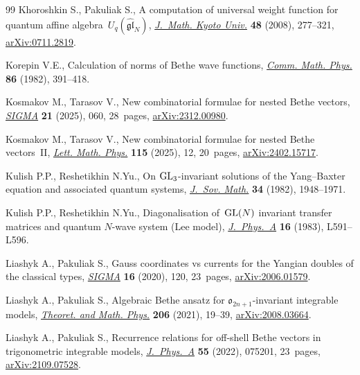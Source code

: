 \documentclass[pdftex]{sigma}
\theoremstyle{definition}
\begin{document}
\begin{thebibliography}{99}
Khoroshkin S., Pakuliak S., A computation of universal weight function for
 quantum affine algebra~{$U_q(\widehat{\mathfrak {gl}}_N)$},
 \href{https://doi.org/10.1215/kjm/1250271413}{\textit{J.~Math. Kyoto Univ.}}
 \textbf{48} (2008), 277--321,
 \href{http://arxiv.org/abs/0711.2819}{arXiv:0711.2819}.

Korepin V.E., Calculation of norms of {B}ethe wave functions,
 \href{https://doi.org/10.1007/BF01212176}{\textit{Comm. Math. Phys.}}
 \textbf{86} (1982), 391--418.

Kosmakov M., Tarasov V., New combinatorial formulae for nested {B}ethe vectors,
 \href{https://doi.org/10.3842/SIGMA.2025.060}{\textit{SIGMA}} \textbf{21}
 (2025), 060, 28~pages,
 \href{http://arxiv.org/abs/2312.00980}{arXiv:2312.00980}.

Kosmakov M., Tarasov V., New combinatorial formulae for nested {B}ethe
 vectors~{II}, \href{https://doi.org/10.1007/s11005-025-01896-2}{\textit{Lett.
 Math. Phys.}} \textbf{115} (2025), 12, 20~pages,
 \href{http://arxiv.org/abs/2402.15717}{arXiv:2402.15717}.

Kulish P.P., Reshetikhin N.Yu., On {${\rm GL}\sb{3}$}-invariant solutions of the
 {Y}ang--{B}axter equation and associated quantum systems,
 \href{https://doi.org/10.1007/BF01095104}{\textit{J.~Sov. Math.}} \textbf{34}
 (1982), 1948--1971.

Kulish P.P., Reshetikhin N.Yu., Diagonalisation of~{${\rm GL}(N)$} invariant
 transfer matrices and quantum {$N$}-wave system ({L}ee model),
 \href{https://doi.org/10.1088/0305-4470/16/16/001}{\textit{J.~Phys.~A}}
 \textbf{16} (1983), L591--L596.

Liashyk A., Pakuliak S., Gauss coordinates vs currents for the {Y}angian
 doubles of the classical types,
 \href{https://doi.org/10.3842/SIGMA.2020.120}{\textit{SIGMA}} \textbf{16}
 (2020), 120, 23~pages,
 \href{http://arxiv.org/abs/2006.01579}{arXiv:2006.01579}.

Liashyk A., Pakuliak S., Algebraic {B}ethe ansatz for {$\mathfrak
 o_{2n+1}$}-invariant integrable models,
 \href{https://doi.org/10.1134/S0040577921010025}{\textit{Theoret. and Math.
 Phys.}} \textbf{206} (2021), 19--39,
 \href{http://arxiv.org/abs/2008.03664}{arXiv:2008.03664}.

Liashyk A., Pakuliak S., Recurrence relations for off-shell {B}ethe vectors in
 trigonometric integrable models,
 \href{https://doi.org/10.1088/1751-8121/ac491b}{\textit{J.~Phys.~A}}
 \textbf{55} (2022), 075201, 23~pages,
 \href{http://arxiv.org/abs/2109.07528}{arXiv:2109.07528}.


\end{thebibliography}
\end{document}
